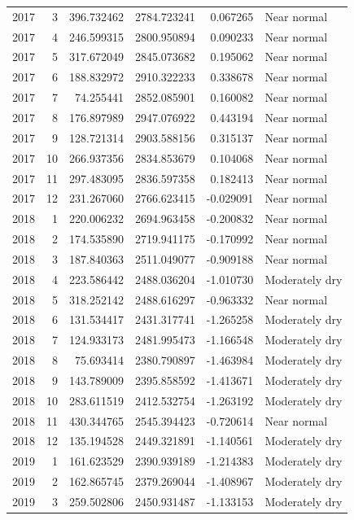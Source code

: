 \begin{tabular}{rrrrrl}
2017 & 3 & 396.732462 & 2784.723241 & 0.067265 & Near normal \\
2017 & 4 & 246.599315 & 2800.950894 & 0.090233 & Near normal \\
2017 & 5 & 317.672049 & 2845.073682 & 0.195062 & Near normal \\
2017 & 6 & 188.832972 & 2910.322233 & 0.338678 & Near normal \\
2017 & 7 & 74.255441 & 2852.085901 & 0.160082 & Near normal \\
2017 & 8 & 176.897989 & 2947.076922 & 0.443194 & Near normal \\
2017 & 9 & 128.721314 & 2903.588156 & 0.315137 & Near normal \\
2017 & 10 & 266.937356 & 2834.853679 & 0.104068 & Near normal \\
2017 & 11 & 297.483095 & 2836.597358 & 0.182413 & Near normal \\
2017 & 12 & 231.267060 & 2766.623415 & -0.029091 & Near normal \\
2018 & 1 & 220.006232 & 2694.963458 & -0.200832 & Near normal \\
2018 & 2 & 174.535890 & 2719.941175 & -0.170992 & Near normal \\
2018 & 3 & 187.840363 & 2511.049077 & -0.909188 & Near normal \\
2018 & 4 & 223.586442 & 2488.036204 & -1.010730 & Moderately dry \\
2018 & 5 & 318.252142 & 2488.616297 & -0.963332 & Near normal \\
2018 & 6 & 131.534417 & 2431.317741 & -1.265258 & Moderately dry \\
2018 & 7 & 124.933173 & 2481.995473 & -1.166548 & Moderately dry \\
2018 & 8 & 75.693414 & 2380.790897 & -1.463984 & Moderately dry \\
2018 & 9 & 143.789009 & 2395.858592 & -1.413671 & Moderately dry \\
2018 & 10 & 283.611519 & 2412.532754 & -1.263192 & Moderately dry \\
2018 & 11 & 430.344765 & 2545.394423 & -0.720614 & Near normal \\
2018 & 12 & 135.194528 & 2449.321891 & -1.140561 & Moderately dry \\
2019 & 1 & 161.623529 & 2390.939189 & -1.214383 & Moderately dry \\
2019 & 2 & 162.865745 & 2379.269044 & -1.408967 & Moderately dry \\
2019 & 3 & 259.502806 & 2450.931487 & -1.133153 & Moderately dry \\

\end{tabular}

